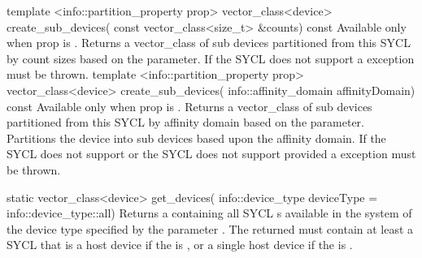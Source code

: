   \addRowThreeSL
    {template <info::partition_property prop>}
    {vector_class<device> create_sub_devices(}
    { const vector_class<size_t> \&counts) const}
    {
      Available only when prop is
      .
      Returns a vector_class of sub devices partitioned from this SYCL  by count sizes based on the  parameter.      
      If the SYCL  does not support  a  exception must be thrown.
    }
  \addRowThreeSL
    {template <info::partition_property prop>}
    {vector_class<device> create_sub_devices(}
    { info::affinity_domain affinityDomain) const}
    {
      Available only when prop is
      .
      Returns a vector_class of sub devices partitioned from this SYCL  by affinity domain based on the  parameter.
      Partitions the device into sub devices based upon the affinity domain.
      If the SYCL  does not support  or the SYCL  does not support  provided a  exception must be thrown.
    }
\completeTable

  \addRowFourL
   {static vector_class<device>}
   {  get_devices(}
   {  info::device_type deviceType = }
   {  info::device_type::all)}
   {
     Returns a  containing all SYCL s available in the system of the device type specified by the parameter . The returned  must contain at least a SYCL  that is a host device if the  is , or a single host device if the  is .
   }
\completeTable

